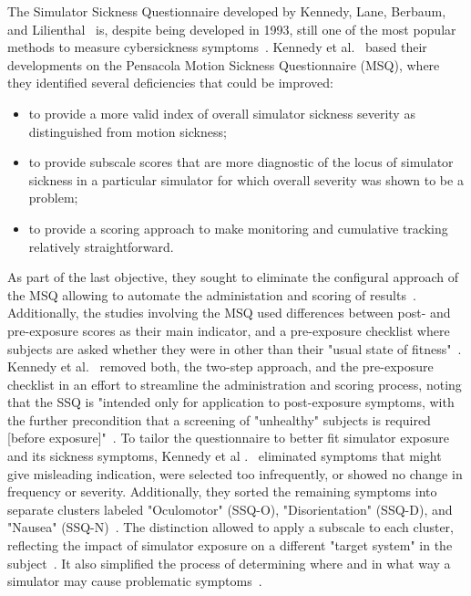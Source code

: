 The Simulator Sickness Questionnaire developed by Kennedy, Lane, Berbaum, and Lilienthal~\cite{Kennedy1993} is,
despite being developed in 1993, still one of the most popular methods to measure cybersickness
symptoms~\cite{Saredakis2020}.
Kennedy et al.~\cite{Kennedy1993} based their developments on the Pensacola Motion Sickness Questionnaire (MSQ),
where they identified several deficiencies that could be improved:
\begin{itemize}
    \item to provide a more valid index of overall simulator sickness severity as distinguished from motion sickness;
    \item to provide subscale scores that are more diagnostic of the locus of simulator sickness in a particular
    simulator for which overall severity was shown to be a problem;
    \item to provide a scoring approach to make monitoring and cumulative tracking relatively straightforward.
\end{itemize}
As part of the last objective, they sought to eliminate the configural approach of the MSQ allowing to automate the
administation and scoring of results~\cite{Kennedy1993}.
Additionally, the studies involving the MSQ used differences between post- and pre-exposure scores as their main
indicator, and a pre-exposure checklist where subjects are asked whether they were in other than their "usual state 
of fitness"~\cite{Kennedy1993}.
Kennedy et al.~\cite{Kennedy1993} removed both, the two-step approach, and the pre-exposure checklist in an effort to
streamline the administration and scoring process, noting that the SSQ is "intended only for application to 
post-exposure symptoms, with the further precondition that a screening of "unhealthy" subjects is required [before exposure]"~\cite[p.
207]{Kennedy1993}.
To tailor the questionnaire to better fit simulator exposure and its sickness symptoms, Kennedy et al
.~\cite{Kennedy1993} eliminated symptoms that might give misleading indication, were selected too infrequently, or
showed no change in frequency or severity.
Additionally, they sorted the remaining symptoms into separate clusters labeled "Oculomotor" (SSQ-O),
"Disorientation" (SSQ-D), and "Nausea" (SSQ-N)~\cite{Kennedy1993}.
The distinction allowed to apply a subscale to each cluster, reflecting the impact of simulator exposure on a
different "target system" in the subject~\cite{Kennedy1993}.
It also simplified the process of determining where and in what way a simulator may cause problematic
symptoms~\cite{Kennedy1993}.
